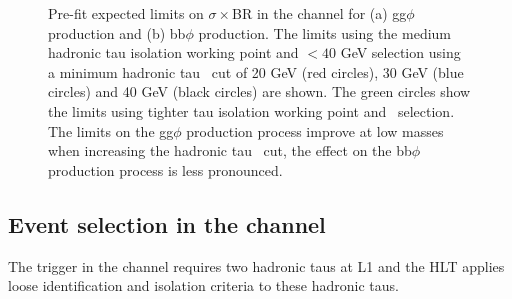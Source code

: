 \begin{figure}[h!]
\begin{center}
\end{center}
\caption{Pre-fit expected limits on $\sigma\times$BR in the \etau channel for (a) gg$\phi$ production and (b) bb$\phi$ production. The
limits using the medium hadronic tau isolation working point and \mT$<40$ GeV selection using a minimum
hadronic tau \pT~cut of 20 GeV (red circles), 30 GeV (blue circles) and 40 GeV (black circles) are shown. The green
circles show the limits using tighter tau isolation working point and \mT~selection. The limits on
the gg$\phi$ production process improve at low masses when increasing the hadronic tau \pT~cut,
the effect on the bb$\phi$ production process is less pronounced.}
\label{fig:mssm_tauptcut_et}
\end{figure}

\subsection{\texorpdfstring{Event selection in the \tautau channel}{Event selection in the tau tau channel}}
\label{sec:mssm_eventsel_tt}
The trigger in the \tautau channel requires two hadronic taus at \ac{L1} and the \ac{HLT}
applies loose identification and isolation criteria to these hadronic taus.

